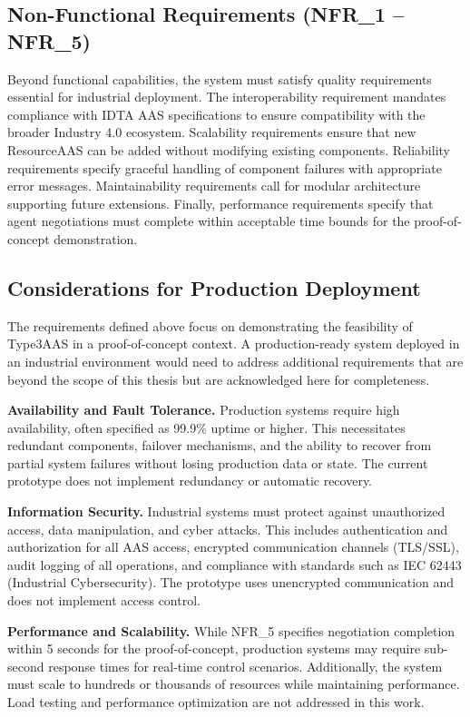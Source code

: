 \subsection{Non-Functional Requirements (NFR\_1 -- NFR\_5)}

Beyond functional capabilities, the system must satisfy quality requirements essential for industrial deployment. The interoperability requirement mandates compliance with IDTA \ac{AAS} specifications to ensure compatibility with the broader Industry 4.0 ecosystem. Scalability requirements ensure that new ResourceAAS can be added without modifying existing components. Reliability requirements specify graceful handling of component failures with appropriate error messages. Maintainability requirements call for modular architecture supporting future extensions. Finally, performance requirements specify that agent negotiations must complete within acceptable time bounds for the proof-of-concept demonstration.
\subsection{Considerations for Production Deployment}
\label{subsec:production_considerations}

The requirements defined above focus on demonstrating the feasibility of \ac{Type3AAS} in a proof-of-concept context. A production-ready system deployed in an industrial environment would need to address additional requirements that are beyond the scope of this thesis but are acknowledged here for completeness.

\textbf{Availability and Fault Tolerance.} Production systems require high availability, often specified as 99.9\% uptime or higher. This necessitates redundant components, failover mechanisms, and the ability to recover from partial system failures without losing production data or state. The current prototype does not implement redundancy or automatic recovery.

\textbf{Information Security.} Industrial systems must protect against unauthorized access, data manipulation, and cyber attacks. This includes authentication and authorization for all \ac{AAS} access, encrypted communication channels (TLS/SSL), audit logging of all operations, and compliance with standards such as IEC 62443 (Industrial Cybersecurity). The prototype uses unencrypted communication and does not implement access control.

\textbf{Performance and Scalability.} While NFR\_5 specifies negotiation completion within 5 seconds for the proof-of-concept, production systems may require sub-second response times for real-time control scenarios. Additionally, the system must scale to hundreds or thousands of resources while maintaining performance. Load testing and performance optimization are not addressed in this work.

